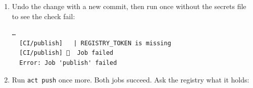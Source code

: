 \begin{enumerate}
  \begin{codeblock}

\begin{Shaded}
\begin{Highlighting}[]
 
\end{Highlighting}
\end{Shaded}

  \end{codeblock}

  \begin{codeblock}
  \begin{Verbatim}[formatcom=\outputstyle]
  …
  [CI/test]   | FAILED test_main.py::test_health - AssertionError: assert 'OK' == 'ok'
  [CI/test]   | 1 failed, 1 passed in 0.13s
  [CI/test]   ❌  Failure - Main pytest -q [334.395125ms]
  [CI/test] 🏁  Job failed
  Error: Job 'test' failed
  \end{Verbatim}
  \end{codeblock}

  The publish job never ran, so no broken image reached the registry.
\item
  Undo the change with a new commit, then run once without the secrets file to see the check fail:

  \begin{codeblock}

\begin{Shaded}
\begin{Highlighting}[]
\end{Highlighting}
\end{Shaded}

  \end{codeblock}

  \begin{codeblock}
  \begin{Verbatim}[formatcom=\outputstyle]
  …
  [CI/publish]   | REGISTRY_TOKEN is missing
  [CI/publish] 🏁  Job failed
  Error: Job 'publish' failed
  \end{Verbatim}
  \end{codeblock}
\item
  Run \texttt{act\ push} once more. Both jobs succeed. Ask the registry what it holds:


\end{enumerate}
